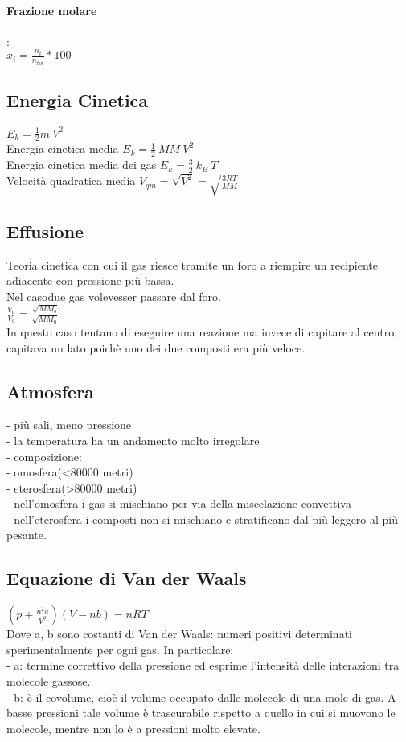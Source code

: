 \paragraph*{Frazione molare}:\\
$x_i = \frac{n_i}{n_{tot}} * 100$
\subsection{Energia Cinetica}
$E_k = \frac{1}{2}m\ V^2$\\
Energia cinetica media $E_k = \frac{1}{2}\ MM\ V^2$\\
Energia cinetica media dei gas $E_k = \frac{3}{2}\ k_B\ T$\\
Velocità quadratica media $V_{qm} = \sqrt{V^2} = \sqrt{\frac{3RT}{MM}}$\\ 
\subsection{Effusione} 
Teoria cinetica con cui il gas riesce tramite un foro a riempire un recipiente adiacente con pressione più bassa.\\
Nel casodue gas volevesser passare dal foro.\\
$\frac{V_a}{V_b}=\frac{\sqrt{MM_b}}{\sqrt{MM_a}}$\\
In questo caso tentano di eseguire una reazione ma invece di capitare al centro, capitava un lato poichè uno dei due composti era più veloce.
\subsection{Atmosfera}
\tab- più sali, meno pressione\\
\tab- la temperatura ha un andamento molto irregolare\\
\tab- composizione:\\
\tab\tab- omosfera(<80000 metri)\\
\tab\tab- eterosfera(>80000 metri)\\
\tab\tab- nell'omosfera i gas si mischiano per via della miscelazione convettiva\\
\tab\tab- nell'eterosfera i composti non si mischiano e stratificano dal più leggero al più pesante.\\
\subsection{Equazione di Van der Waals}
$\left(p+\frac{n^2a}{V^2}\right)\left(V-nb\right) = nRT$\\
Dove a, b sono costanti di Van der Waals: numeri positivi determinati sperimentalmente per ogni gas. In particolare:\\
\tab- a: termine correttivo della pressione ed esprime l'intensità delle interazioni tra molecole gassose.\\
\tab- b: è il covolume, cioè il volume occupato dalle molecole di una mole di gas. A basse pressioni tale volume è trascurabile rispetto a quello in cui si muovono le molecole, mentre non lo è a pressioni molto elevate.
